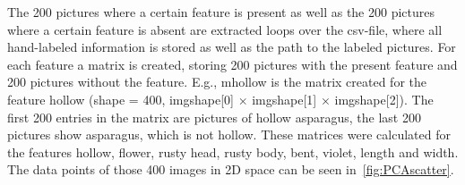 The 200 pictures where a certain feature is present as well as the 200 pictures where a certain feature is absent are extracted loops over the csv-file, where all hand-labeled information is stored as well as the path to the labeled pictures. For each feature a matrix is created, storing 200 pictures with the present feature and 200 pictures without the feature. E.g., m\textunderscore hollow is the matrix created for the feature hollow (shape = 400, img\textunderscore shape[0] $\times$ img\textunderscore shape[1] $\times$ img\textunderscore shape[2]). The first 200 entries in the matrix are pictures of hollow asparagus, the last 200 pictures show asparagus, which is not hollow. These matrices were calculated for the features hollow,  flower, rusty head, rusty body, bent, violet, length and width. The data points of those 400 images in 2D space can be seen in~\autoref{fig:PCAscatter}.

